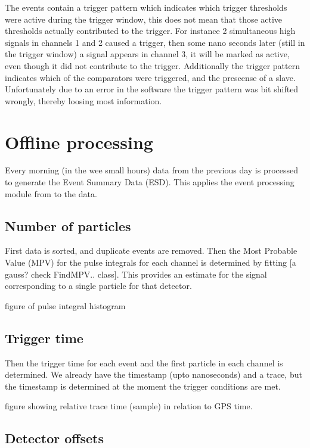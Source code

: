 The \hisparc events contain a trigger pattern which indicates which trigger thresholds were active during the trigger window, this does not mean that those active thresholds actually contributed to the trigger. For instance 2 simultaneous high signals in channels 1 and 2 caused a trigger, then some nano seconds later (still in the trigger window) a signal appears in channel 3, it will be marked as active, even though it did not contribute to the trigger. Additionally the trigger pattern indicates which of the comparators were triggered, and the prescense of a slave. Unfortunately due to an error in the software the trigger pattern was bit shifted wrongly, thereby loosing most information.


\section{Offline processing}

Every morning (in the wee small hours) data from the previous day is processed to generate the Event Summary Data (ESD). This applies the event processing module from \sapphire to the data.

\subsection{Number of particles}

First data is sorted, and duplicate events are removed. Then the Most Probable Value (MPV) for the pulse integrals for each channel is determined by fitting [a gauss? check FindMPV.. class]. This provides an estimate for the signal corresponding to a single particle for that detector.

figure of pulse integral histogram


\subsection{Trigger time}

Then the trigger time for each event and the first particle in each channel is determined. We already have the \gps timestamp (upto nanoseconds) and a trace, but the timestamp is determined at the moment the trigger conditions are met. 

figure showing  relative trace time (sample)  in relation to GPS time.


\subsection{Detector offsets}

